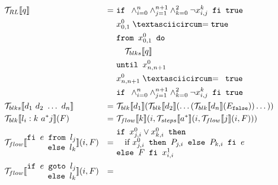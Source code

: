 \begin{figure}
  $$\begin{aligned}
    & \mathcal{T}_{RL}\llbracket q\rrbracket  & =\ & \texttt{if } \land_{i=0}^n\land_{j=1}^{n+1}\land_{k=0}^2\neg x_{i,j}^k\texttt{ fi true}\\
    &                                         &    & x_{0,1}^{0} \xoreq \texttt{true}\\
    &                                         &    & \texttt{from }x_{0,1}^0\texttt{ do}\\
    &                                         &    & \quad \mathcal{T}_{blks}\llbracket q\rrbracket\\
    &                                         &    & \texttt{until } x_{n,n+1}^0\\
    &                                         &    & x_{n,n+1}^0 \xoreq \texttt{ true}\\
    &                                         &    & \texttt{if } \land_{i=0}^n\land_{j=1}^{n+1}\land_{k=0}^2\neg x_{i,j}^k\texttt{ fi true}\\
    & \mathcal{T}_{blks}\llbracket d_1\ d_2\ \dots\ d_n\rrbracket & =\ &
      \mathcal{T}_{blk}\llbracket d_1 \rrbracket(\mathcal{T}_{blk}\llbracket d_2\rrbracket(\dots(\mathcal{T}_{blk}\llbracket d_n\rrbracket(E_\texttt{false}))\dots))\\
    & \mathcal{T}_{blk}\llbracket l_i : k\ a^* j \rrbracket(F) & =\ &
      \mathcal{T}_{flow}\llbracket k\rrbracket(i,\mathcal{T}_{steps}\llbracket a^*\rrbracket(i,\mathcal{T}_{flow}\llbracket j\rrbracket(i,F)))\\
    & \mathcal{T}_{flow}\llbracket\begin{matrix*}[r]\texttt{fi }e\texttt{ from }l_j\\\texttt{else }l_k\end{matrix*}\rrbracket(i,F) & =\ &
      \begin{matrix*}[l]
        \texttt{if }x_{j,i}^0\lor x_{k,i}^0\texttt{ then}\\
        \quad\text{if }x_{j,i}^0\texttt{ then }P_{j,i}\texttt{ else }P_{k,i}\texttt{ fi }e\\
        \texttt{else }F\texttt{ fi }x_{i,i}^1\\
      \end{matrix*}\\
    & \mathcal{T}_{flow}\llbracket\begin{matrix*}[r]\texttt{if }e\texttt{ goto }l_j\\\texttt{else }l_k\end{matrix*}\rrbracket(i,F) & =\ &

\end{aligned}$$
\end{figure}
